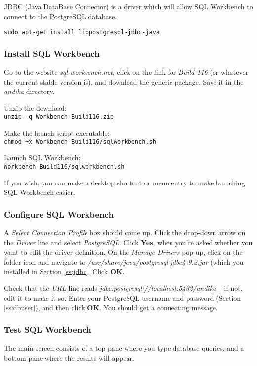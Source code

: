 \documentclass[a4paper,10pt]{article}
\begin{document}
JDBC (Java DataBase Connector) is a driver which will allow SQL Workbench to connect to the PostgreSQL database.

\verb|sudo apt-get install libpostgresql-jdbc-java|

\subsubsection{Install SQL Workbench}

Go to the website \textit{sql-workbench.net}, click on the link for \textit{Build 116} (or whatever the current stable version is), and download the generic package.  Save it in the \textit{andika} directory.

Unzip the download:\\
\verb|unzip -q Workbench-Build116.zip|

Make the launch script executable:\\
\verb|chmod +x Workbench-Build116/sqlworkbench.sh|

Launch SQL Workbench:\\
\verb|Workbench-Build116/sqlworkbench.sh|

If you wish, you can make a desktop shortcut or menu entry to make launching SQL Workbench easier.

\subsubsection{Configure SQL Workbench}

A \textit{Select Connection Profile} box should come up. Click the drop-down arrow on the \textit{Driver} line and select \textit{PostgreSQL}. Click \textbf{Yes}, when you're asked whether you want to edit the driver definition. On the \textit{Manage Drivers} pop-up, click on the folder icon and navigate to \textit{/usr/share/java/postgresql-jdbc4-9.2.jar} (which you installed in Section \ref{ss:jdbc}.  Click \textbf{OK}.

Check that the \textit{URL} line reads \textit{jdbc:postgresql://localhost:5432/andika} -- if not, edit it to make it so. Enter your PostgreSQL username and password (Section \ref{ss:dbuser}), and then click \textbf{OK}.  You should get a connecting message.

\subsubsection{Test SQL Workbench}

The main screen consists of a top pane where you type database queries, and a bottom pane where the results will appear. 
\end{document}
